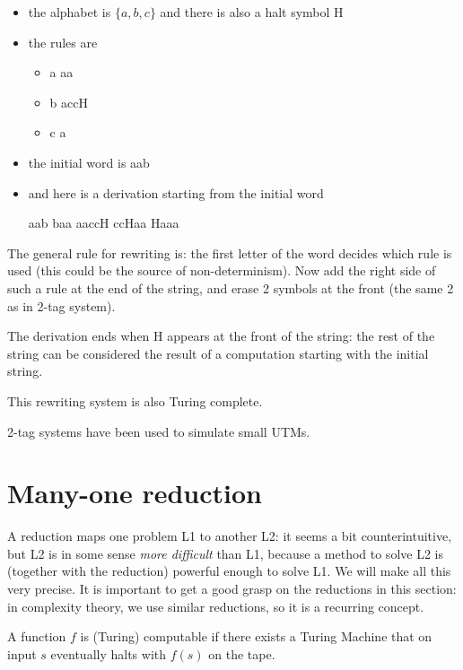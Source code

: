 \begin{itemize}
\item the alphabet is $\{a,b,c\}$ and there is also a halt symbol H
\item the rules are
\begin{itemize}
\item a \rpijl aa
\item b \rpijl accH
\item c \rpijl a
\end{itemize}

\item the initial word is aab
\item and here is a derivation starting from the initial word

aab \rpijl baa \rpijl aaccH \rpijl ccHaa \rpijl Haaa
\end{itemize}

The general rule for rewriting is: the first letter of the word
decides which rule is used (this could be the source of
non-determinism). Now add the right side of such a rule at the end of
the string, and erase 2 symbols at the front (the same 2 as in 2-tag
system).

The derivation ends when H appears at the front of the string: the
rest of the string can be considered the result of a computation
starting with the initial string.

This rewriting system is also Turing complete.


2-tag systems have been used to simulate small UTMs.


\clearpage
\section{Many-one reduction}\label{mappingreduction}

A reduction maps one problem L1 to another L2: it seems a bit counterintuitive,
but L2 is in some sense {\em more difficult} than L1,
because a method to solve L2 is (together with the reduction) powerful
enough to solve L1. We will make all this very precise. It is important
to get a good grasp on the reductions in this section: in complexity
theory, we use similar reductions, so it is a recurring concept.

%

\begin{definition}
A function $f$ is (Turing)
       computable if there exists a Turing Machine that on input $s$
       eventually halts with $f(s)$ on the tape.
\end{definition}

